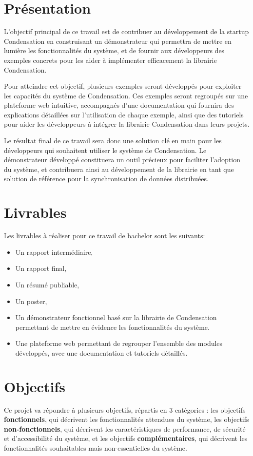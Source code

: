\section*{Présentation}
L'objectif principal de ce travail est de contribuer au développement de la startup Condensation en construisant un démonstrateur qui permettra de mettre en lumière les fonctionnalités du système, et de fournir aux développeurs des exemples concrets pour les aider à implémenter efficacement la librairie Condensation.

Pour atteindre cet objectif, plusieurs exemples seront développés pour exploiter les capacités du système de Condensation. Ces exemples seront regroupés sur une plateforme web intuitive, accompagnés d'une documentation qui fournira des explications détaillées sur l'utilisation de chaque exemple, ainsi que des tutoriels pour aider les développeurs à intégrer la librairie Condensation dans leurs projets.

Le résultat final de ce travail sera donc une solution clé en main pour les développeurs qui souhaitent utiliser le système de Condensation. Le démonstrateur développé constituera un outil précieux pour faciliter l'adoption du système, et contribuera ainsi au développement de la librairie en tant que solution de référence pour la synchronisation de données distribuées.

\section*{Livrables}
Les livrables à réaliser pour ce travail de bachelor sont les suivants:

\begin{itemize}
    \item Un rapport intermédiaire,
    \item Un rapport final,
    \item Un résumé publiable,
    \item Un poster,
    \item Un démonstrateur fonctionnel basé sur la librairie de Condensation permettant de mettre en évidence les fonctionnalités du système.
    \item Une plateforme web permettant de regrouper l'ensemble des modules développés, avec une documentation et tutoriels détaillés.
\end{itemize}

\section*{Objectifs}
Ce projet va répondre à plusieurs objectifs, répartis en 3 catégories : les objectifs \textbf{fonctionnels}, qui décrivent les fonctionnalités attendues du système, les objectifs \textbf{non-fonctionnels}, qui décrivent les caractéristiques de performance, de sécurité et d'accessibilité du système, et les objectifs \textbf{complémentaires}, qui décrivent les fonctionnalités souhaitables mais non-essentielles du système.

